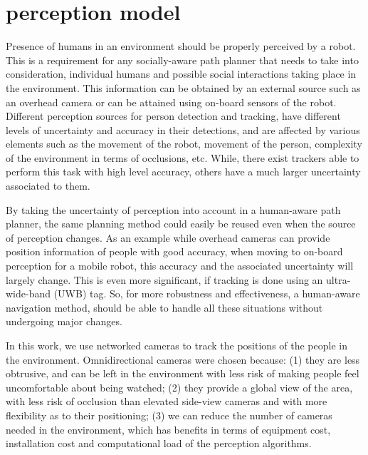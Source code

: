 \section{perception model}
\label{perception_model}


Presence of humans in an environment should be properly perceived by a robot. This is a requirement for any socially-aware path planner that needs to take into consideration, individual humans and possible social interactions taking place in the environment. 
This information can be obtained by an external source such as an overhead camera or can be attained using on-board sensors of the robot. Different perception sources for person detection and tracking, have different levels of uncertainty and accuracy in their detections, and are affected by various elements such as the movement of the robot, movement of the person, complexity of the environment in terms of occlusions, etc. While, there exist trackers able to perform this task with high level accuracy, others have a much larger uncertainty associated to them. 

By taking the uncertainty of perception into account in a human-aware path planner, the same planning method could easily be reused even when the source of perception changes. As an example while overhead cameras can provide position information of people with good accuracy, when moving to on-board perception for a mobile robot, this accuracy and the associated uncertainty will largely change. This is even more significant, if tracking is done using an ultra-wide-band (UWB) tag. So, for more robustness and effectiveness, a human-aware navigation method, should be able to handle all these situations without undergoing major changes.

In this work, we use networked cameras to track the positions of the people in the environment. Omnidirectional cameras were chosen because: (1) they are less obtrusive, and can be left in the environment with less risk
of making people feel uncomfortable about being watched; (2) they provide a global view of the area, with less risk of occlusion than elevated side-view cameras and with more flexibility as to their positioning; (3) we can reduce the number of cameras needed in the environment, which has benefits in terms of equipment cost, installation cost and computational load of the perception algorithms.
